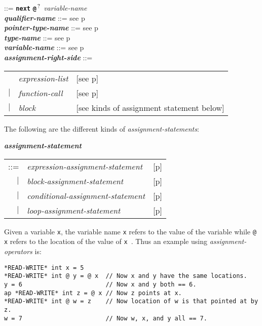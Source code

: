 \documentclass[12pt]{article}
\newcommand{\TT}[1]{{\tt \bfseries #1}}
\newcommand{\QMARK}{{$^{\,\mbox{\footnotesize ?}}$}}
\newcommand{\ttkey}[1]{{\tt \bfseries #1}}
\newcommand{\emkey}[1]{{\em \bfseries #1}}
\newcommand{\pagref}[1]{p\pageref{#1}}
\newenvironment{indpar}[1][0.3in]%
	{\begin{list}{}%
		     {\setlength{\itemsep}{0in}%
		      \setlength{\topsep}{0in}%
		      \setlength{\parsep}{1ex}%
		      \setlength{\labelwidth}{#1}%
		      \setlength{\leftmargin}{#1}%
		      \addtolength{\leftmargin}{\labelsep}}%
	 \item}%
	{\end{list}}
\begin{document}
\begin{indpar}
    ::= \ttkey{next} \TT{@}\QMARK{} {\em variable-name}
\\[0.5ex]
\emkey{qualifier-name} ::= see \pagref{QUALIFIER-NAME}
\\[0.5ex]
\emkey{pointer-type-name} ::= see \pagref{POINTER-TYPE-NAME}
\\[0.5ex]
\emkey{type-name} ::= see \pagref{TYPE-NAME}
\\[0.5ex]
\emkey{variable-name} ::= see \pagref{VARIABLE-NAME}
\\[0.5ex]
\emkey{assignment-right-side}\label{ASSIGNMENT-RIGHT-SIDE} ::= \\
\hspace*{1in}
    \begin{tabular}[t]{@{}rll}
        & {\em expression-list}
    		& [see \pagref{EXPRESSION-LIST}] \\
    $|$ & {\em function-call}
    		& [see \pagref{FUNCTION-CALLS}] \\
    $|$ & {\em block}
	        & [see kinds of assignment statement below] \\
    \end{tabular}
\end{indpar}

The following are the different kinds of {\em assignment-statements}:
\begin{indpar}
\emkey{assignment-statement}
    \begin{tabular}[t]{@{}rll}
    ::= & {\em expression-assignment-statement}
    	& [\pagref{EXPRESSION-ASSIGNMENT-STATEMENTS}] \\
    $|$ & {\em block-assignment-statement}
        & [\pagref{BLOCK-ASSIGNMENT-STATEMENTS}] \\
    $|$ & {\em conditional-assignment-statement}
        & [\pagref{CONDITIONAL-ASSIGNMENT-STATEMENTS}] \\
    $|$ & {\em loop-assignment-statement}
        & [\pagref{LOOP-ASSIGNMENT-STATEMENTS}] \\
    \end{tabular}
\end{indpar}


Given a variable {\tt x}, the variable name {\tt x} refers to the
value of the variable while {\tt @ x} refers to the location of
the value of {\tt x }.
Thus an example using {\em assignment-operators} is:
\begin{indpar}\begin{verbatim}
*READ-WRITE* int x = 5
*READ-WRITE* int @ y = @ x  // Now x and y have the same locations.
y = 6                       // Now x and y both == 6.
ap *READ-WRITE* int z = @ x // Now z points at x.
*READ-WRITE* int @ w = z    // Now location of w is that pointed at by z.
w = 7                       // Now w, x, and y all == 7.
\end{verbatim}\end{indpar}
\end{document}
